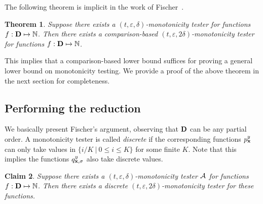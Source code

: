 \documentclass[11pt]{article}
\newtheorem{theorem}{Theorem}[section]
\newtheorem{claim}[theorem]{Claim}
\def\eps{\varepsilon}
\def\x{{\bf x}}
\newcommand{\cA}{{\cal A}}
\newcommand{\NN}{\mathbb{N}}
\begin{document}
The following theorem is implicit in the work of Fischer~\cite{E04}.

\begin{theorem} \label{thm:fischer} Suppose there exists a $(t,\eps,\delta)$-monotonicity tester
for functions $f: \D \mapsto \NN$. Then there exists a comparison-based $(t,\eps,2\delta)$-monotonicity tester
for functions $f: \D \mapsto \NN$.
\end{theorem}

This implies that a comparison-based lower bound suffices for proving a general lower bound on monotonicity testing.
We provide a proof of the above theorem in the next section for completeness.

\subsection{Performing the reduction} \label{sec:comp}

We basically present Fischer's argument, observing that ${\mathbf D}$ can be any partial order. 
A monotonicity tester is called \emph{discrete} if the corresponding functions $p^y_{\x}$ can
only take values in $\{i/K \ | \ 0 \leq i \leq K\}$ for some finite $K$. Note that this implies the functions $q^y_{\x,\sigma}$ also take discrete values.

\begin{claim} \label{clm:discrete} Suppose there exists a $(t,\eps,\delta)$-monotonicity tester $\cA$
for functions $f: \D \mapsto \NN$. Then there exists a discrete $(t,\eps,2\delta)$-monotonicity tester for these functions.
\end{claim}
\def\p{\hat{p}}
\end{document}
